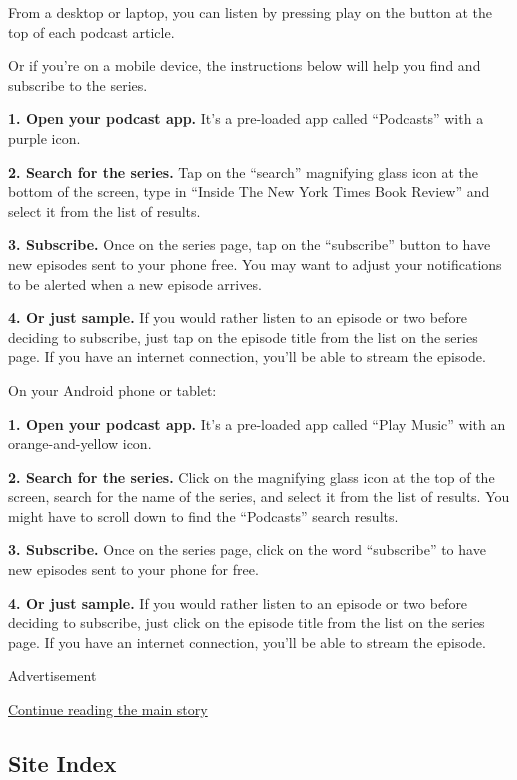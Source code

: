 From a desktop or laptop, you can listen by pressing play on the button
at the top of each podcast article.

Or if you're on a mobile device, the instructions below will help you
find and subscribe to the series.

\textbf{1. Open your podcast app.} It's a pre-loaded app called
``Podcasts'' with a purple icon.

\textbf{2. Search for the series.} Tap on the ``search'' magnifying
glass icon at the bottom of the screen, type in ``Inside The New York
Times Book Review'' and select it from the list of results.

\textbf{3. Subscribe.} Once on the series page, tap on the ``subscribe''
button to have new episodes sent to your phone free. You may want to
adjust your notifications to be alerted when a new episode arrives.

\textbf{4. Or just sample.} If you would rather listen to an episode or
two before deciding to subscribe, just tap on the episode title from the
list on the series page. If you have an internet connection, you'll be
able to stream the episode.

On your Android phone or tablet:

\textbf{1. Open your podcast app.} It's a pre-loaded app called ``Play
Music'' with an orange-and-yellow icon.

\textbf{2. Search for the series.} Click on the magnifying glass icon at
the top of the screen, search for the name of the series, and select it
from the list of results. You might have to scroll down to find the
``Podcasts'' search results.

\textbf{3. Subscribe.} Once on the series page, click on the word
``subscribe'' to have new episodes sent to your phone for free.

\textbf{4. Or just sample.} If you would rather listen to an episode or
two before deciding to subscribe, just click on the episode title from
the list on the series page. If you have an internet connection, you'll
be able to stream the episode.

Advertisement

\protect\hyperlink{after-bottom}{Continue reading the main story}

\hypertarget{site-index}{%
\subsection{Site Index}\label{site-index}}


